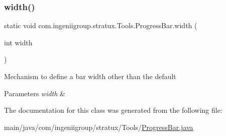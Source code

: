 \subsubsection{\texorpdfstring{width()}{width()}}
{\footnotesize\ttfamily static void com.\+ingeniigroup.\+stratux.\+Tools.\+Progress\+Bar.\+width (\begin{DoxyParamCaption}\item[{int}]{width }\end{DoxyParamCaption})\hspace{0.3cm}{\ttfamily [static]}}

Mechanism to define a bar width other than the default 
\begin{DoxyParams}{Parameters}
{\em width} & \\
\hline
\end{DoxyParams}


The documentation for this class was generated from the following file\+:\begin{DoxyCompactItemize}
\item 
main/java/com/ingeniigroup/stratux/\+Tools/\hyperlink{_progress_bar_8java}{Progress\+Bar.\+java}\end{DoxyCompactItemize}
